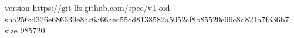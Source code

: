 version https://git-lfs.github.com/spec/v1
oid sha256:d326e686639e8ac6a66aec55cd8138582a5052cf8b85520e96c8d821a7f336b7
size 985720
